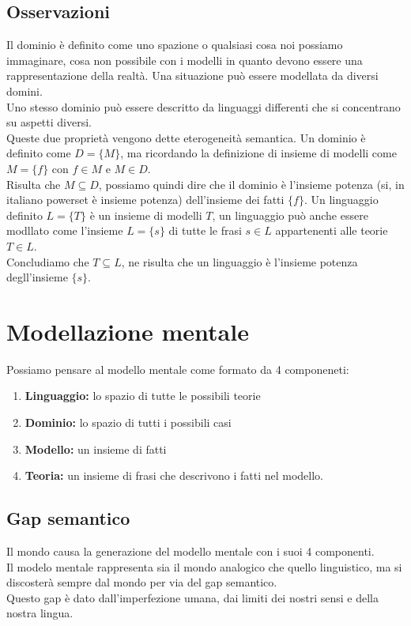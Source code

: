 \documentclass[../main.tex]{subfiles}
\newcommand{\spazio}{\vspace{1em} \newline}
\begin{document}
    \subsection{Osservazioni}
    Il dominio è definito come uno spazione o qualsiasi cosa noi possiamo immaginare, cosa non possibile con i modelli in quanto devono essere una rappresentazione della realtà.
    \spazio
    Una situazione può essere modellata da diversi domini.\\
    Uno stesso dominio può essere descritto da linguaggi differenti che si concentrano su aspetti diversi.\\
    Queste due proprietà vengono dette eterogeneità semantica.
    \spazio
    Un dominio è definito come $D=\{M\}$, ma ricordando la definizione di insieme di modelli come $M=\{f\}$ con $f \in M$ e $M \in D$.\\
    Risulta che $M \subseteq D$, possiamo quindi dire che il dominio è l'insieme potenza (si, in italiano powerset è insieme potenza) dell'insieme dei fatti $\{f\}$.
    \spazio
    Un linguaggio definito $L=\{T\}$ è un insieme di modelli $T$, un linguaggio può anche essere modllato come l'insieme $L=\{s\}$ di tutte le frasi $s \in L$ appartenenti alle teorie $T \in L$.\\
    Concludiamo che $T \subseteq L$, ne risulta che un linguaggio è l'insieme potenza degll'insieme $\{s\}$.

    \section{Modellazione mentale}
    Possiamo pensare al modello mentale come formato da 4 componeneti:
    \begin{enumerate}
        \item \textbf{Linguaggio:} lo spazio di tutte le possibili teorie
        \item \textbf{Dominio:} lo spazio di tutti i possibili casi
        \item \textbf{Modello:} un insieme di fatti
        \item \textbf{Teoria:} un insieme di frasi che descrivono i fatti nel modello.
    \end{enumerate}

    \subsection{Gap semantico}
    Il mondo causa la generazione del modello mentale con i suoi 4 componenti.\\
    Il modelo mentale rappresenta sia il mondo analogico che quello linguistico, ma si discosterà sempre dal mondo per via del gap semantico.\\
    Questo gap è dato dall'imperfezione umana, dai limiti dei nostri sensi e della nostra lingua.
\end{document}
